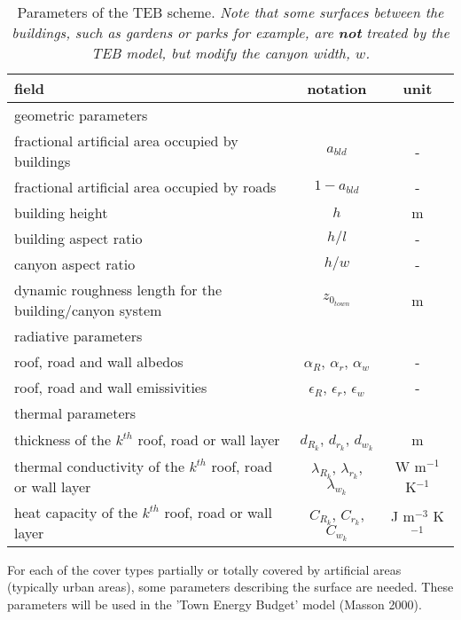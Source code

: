 \begin{table}[h]

{\footnotesize{
\begin{tabular}{||l |c|c||}
\hline
\hline
field                         & notation & unit    \\
\hline
geometric parameters && \\
\hline
 fractional artificial area occupied by buildings & $a_{bld}$                 & - \\
 fractional artificial area occupied by roads     & $1 - a_{bld}$             &- \\
 building height                       & $h$                       &m \\
 building aspect ratio           & $h/l$                     & - \\
 canyon aspect ratio             & $h/w$                     &- \\
 dynamic roughness length for the building/canyon system & $z_{0_{town}}$            & m \\
\hline
radiative parameters && \\
\hline
 roof, road and wall albedos & $\alpha_R$, $\alpha_r$, $\alpha_w$              &- \\
roof, road and wall emissivities
              &$\epsilon_R$, $\epsilon_r$, $\epsilon_w$            & - \\
\hline
thermal parameters && \\
\hline
 thickness of the $k^{th}$ roof, road or wall layer &$d_{R_k}$, $d_{r_k}$, $d_{w_k}$ & m \\
 thermal conductivity of the $k^{th}$ roof, road or wall layer & $\lambda_{R_k}$, $\lambda_{r_k}$, $\lambda_{w_k}$          &W m$^{-1}$ K$^{-1}$\\
 heat capacity of the $k^{th}$ roof, road or wall layer & $C_{R_k}$, $C_{r_k}$, $C_{w_k}$                 &J m$^{-3}$ K$^{-1}$\\
\hline
\hline
\end{tabular}
}}

\caption{Parameters of the TEB scheme.  {\it{
Note that some surfaces
between the buildings, such as gardens or parks for example, are {\bf not}
treated by the TEB model, but modify the canyon width, $w$.}}
}
\label{paramTEB}
\end{table}

For each of the cover types partially or totally covered by
artificial areas (typically urban areas), some parameters describing the
surface are needed.
These parameters will be used in the 'Town Energy Budget' model (Masson 2000).

